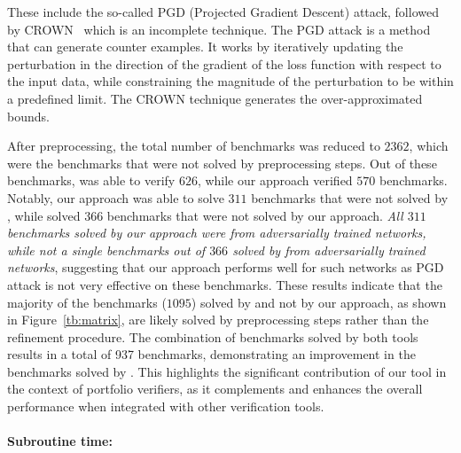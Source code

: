 These include the so-called PGD (Projected Gradient Descent) attack, followed by CROWN~\cite{zhang2018efficient} which is an incomplete technique. The PGD attack is a method that can generate counter examples. It works by iteratively updating the  perturbation in the direction of the gradient of the loss function with respect to the input data,  while constraining the magnitude of the perturbation to be within a predefined limit. The CROWN technique generates the over-approximated bounds. %

After preprocessing, the total number of benchmarks was reduced to $2362$, which were the benchmarks that were not 
solved by preprocessing steps. Out of these benchmarks, \alphabeta{} was able to verify $626$, 
while our approach verified 
$570$ benchmarks. Notably, our approach was able to solve $311$ benchmarks that were not solved by \alphabeta{}, 
while \alphabeta{} solved $366$ benchmarks that were not solved by our approach. 
\textit{All $311$ benchmarks solved by our approach were from adversarially trained networks, while 
not a single benchmarks out of $366$ solved by \alphabeta{} from adversarially trained networks}, 
suggesting that our approach performs 
well for such networks as PGD attack is not very effective on these benchmarks. 
These results indicate that the majority of the benchmarks ($1095$) solved by \alphabeta{} and not by our approach, 
as shown in Figure~\ref{tb:matrix}, are likely solved by preprocessing steps rather than the refinement procedure.
The combination of benchmarks solved by both tools results in a total of 937 benchmarks, 
demonstrating an improvement in the benchmarks solved by \alphabeta{}. 
This highlights the significant contribution of our tool in the context of portfolio verifiers, 
as it complements and enhances the overall performance when integrated with other verification tools.


\paragraph{Subroutine time: }


